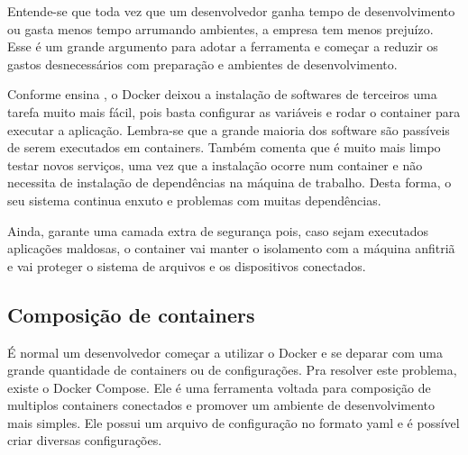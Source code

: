 \documentclass[
	12pt,				%
	openright,			%
	oneside,			%
	a4paper,			%
	chapter=TITLE,		%
	section=TITLE,		%
	english,			%
	french,				%
	spanish,			%
	brazil				%
	]{abntex2}
\begin{document}
Entende-se que toda vez que um desenvolvedor ganha tempo de desenvolvimento ou gasta menos tempo arrumando ambientes, a empresa tem menos prejuízo. Esse é um grande argumento para adotar a ferramenta e começar a reduzir os gastos desnecessários com preparação e ambientes de desenvolvimento.

Conforme ensina , o Docker deixou a instalação de softwares de terceiros uma tarefa muito mais fácil, pois basta configurar as variáveis e rodar o container para executar a aplicação. Lembra-se que a grande maioria dos software são passíveis de serem executados em containers. Também comenta que é muito mais limpo testar novos serviços, uma vez que a instalação ocorre num container e não necessita de instalação de dependências na máquina de trabalho. Desta forma, o seu sistema continua enxuto e problemas com muitas dependências.

Ainda, garante uma camada extra de segurança pois, caso sejam executados aplicações maldosas, o container vai manter o isolamento com a máquina anfitriã e vai proteger o sistema de arquivos e os dispositivos conectados.

\subsection{Composição de containers}

É normal um desenvolvedor começar a utilizar o Docker e se deparar com uma grande quantidade de containers ou de configurações. Pra resolver este problema, existe o Docker Compose. Ele é uma ferramenta voltada para composição de multiplos containers conectados e promover um ambiente de desenvolvimento mais simples. Ele possui um arquivo de configuração no formato yaml e é possível criar diversas configurações.





%
%
\end{document}
